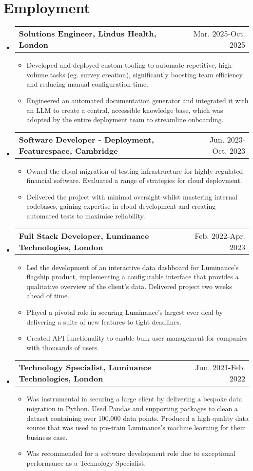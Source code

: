 \documentclass[letterpaper,11pt]{article}
\makeatletter
\newcommand{\resumeItem}[1]{
  \item\small{
    {#1 \vspace{-2pt}}
  }
}
\newcommand{\resumeOneLineSubheading}[2]{
  \vspace{-2pt}\item
    \begin{tabular*}{0.97\textwidth}[t]{l@{\extracolsep{\fill}}r}
      \textbf{#1} & #2 \\
    \end{tabular*}\vspace{-7pt}
}
\newcommand{\resumeSubHeadingListStart}{\begin{itemize}[leftmargin=0.15in, label={}]}
\newcommand{\resumeSubHeadingListEnd}{\end{itemize}}
\newcommand{\resumeItemListStart}{\begin{itemize}}
\newcommand{\resumeItemListEnd}{\end{itemize}\vspace{-5pt}}
\makeatother
\begin{document}
\section{Employment}
  \vspace{3pt}
  \resumeSubHeadingListStart
    \resumeOneLineSubheading
      {Solutions Engineer, Lindus Health, London}{Mar. 2025-Oct. 2025}
      \resumeItemListStart
        \resumeItem{Developed and deployed custom tooling to automate repetitive, high-volume tasks (eg. survey creation), significantly boosting team efficiency and reducing manual configuration time.}
        \resumeItem{Engineered an automated documentation generator and integrated it with an LLM to create a central, accessible knowledge base, which was adopted by the entire deployment team to streamline onboarding.}
      \resumeItemListEnd
    \resumeOneLineSubheading
      {Software Developer - Deployment, Featurespace, Cambridge}{Jun. 2023-Oct. 2023}
      {}{}
      \resumeItemListStart
        \resumeItem{Owned the cloud migration of testing infrastructure for highly regulated financial software. Evaluated a range of strategies for cloud deployment.}
        \resumeItem{Delivered the project with minimal oversight whilst mastering internal codebases, gaining expertise in cloud development and creating automated tests to maximise reliability.}
      \resumeItemListEnd
    \resumeOneLineSubheading
      {Full Stack Developer, Luminance Technologies, London}{Feb. 2022-Apr. 2023}
      {}{}
      \resumeItemListStart
        \resumeItem{Led the development of an interactive data dashboard for Luminance's flagship product, implementing a configurable interface that provides a qualitative overview of the client's data. Delivered project two weeks ahead of time.}
        \resumeItem{Played a pivotal role in securing Luminance's largest ever deal by delivering a suite of new features to tight deadlines.}
        \resumeItem{Created API functionality to enable bulk user management for companies with thousands of users.}
      \resumeItemListEnd
    \resumeOneLineSubheading
      {Technology Specialist, Luminance Technologies, London}{Jun. 2021-Feb. 2022}
      {}{}
      \resumeItemListStart
        \resumeItem{Was instrumental in securing a large client by delivering a bespoke data migration in Python. Used Pandas and supporting packages to clean a dataset containing over 100,000 data points. Produced a high quality data source that was used to pre-train Luminance's machine learning for their business case.}
        \resumeItem{Was recommended for a software development role due to exceptional performance as a Technology Specialist.}
      \resumeItemListEnd
  \resumeSubHeadingListEnd


\end{document}

